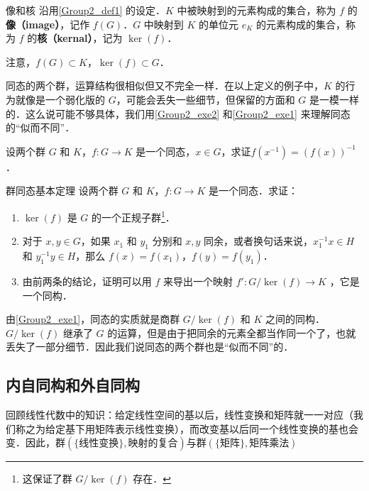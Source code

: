 \begin{definition}{像和核}
沿用\autoref{Group2_def1} 的设定．$K$ 中被映射到的元素构成的集合，称为 $f$ 的\textbf{像（image）}，记作 $f(G)$．$G$ 中映射到 $K$ 的单位元 $e_K$ 的元素构成的集合，称为 $f$ 的\textbf{核（kernal）}，记为 $\ker(f)$．
\end{definition}

注意，$f(G)\subset K$，$\ker(f)\subset G$．

同态的两个群，运算结构很相似但又不完全一样．在以上定义的例子中，$K$ 的行为就像是一个弱化版的 $G$，可能会丢失一些细节，但保留的方面和 $G$ 是一模一样的．这么说可能不够具体，我们用\autoref{Group2_exe2} 和\autoref{Group2_exe1} 来理解同态的“似而不同”．


\begin{exercise}{}\label{Group2_exe2}
设两个群 $G$ 和 $K$，$f:G\rightarrow K$ 是一个同态，$x\in G$，求证$f(x^{-1})=(f(x))^{-1}$．
\end{exercise}


\begin{exercise}{群同态基本定理}\label{Group2_exe1}
设两个群 $G$ 和 $K$，$f:G\rightarrow K$ 是一个同态．求证：
\begin{enumerate}
\item $\ker(f)$ 是 $G$ 的一个正规子群\footnote{这保证了群 $G/\ker(f)$ 存在．}．
\item 对于 $x, y\in G$，如果 $x_1$ 和 $y_1$ 分别和 $x, y$ 同余，或者换句话来说，$x_1^{-1}x\in H$ 和 $y_1^{-1}y\in H$，那么 $f(x)=f(x_1)$，$f(y)=f(y_1)$．
\item 由前两条的结论，证明可以用 $f$ 来导出一个映射 $f': G/\ker(f)\rightarrow K$ ，它是一个同构．

\end{enumerate}
\end{exercise}

由\autoref{Group2_exe1}，同态的实质就是商群 $G/\ker(f)$ 和 $K$ 之间的同构．$G/\ker(f)$ 继承了 $G$ 的运算，但是由于把同余的元素全都当作同一个了，也就丢失了一部分细节．因此我们说同态的两个群也是“似而不同”的．



\subsection{内自同构和外自同构}

回顾线性代数中的知识：给定线性空间的基以后，线性变换和矩阵就一一对应（我们称之为给定基下用矩阵表示线性变换），而改变基以后同一个线性变换的基也会变．因此，群$(\{\text{线性变换}\}, \text{映射的复合})$与群$(\{\text{矩阵}\}, \text{矩阵乘法})$













